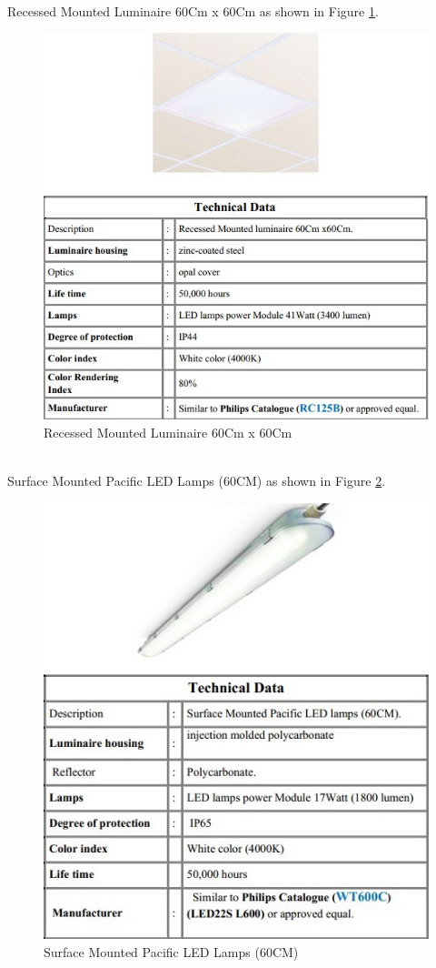 \documentclass[12pt,fleqn]{book} %
\begin{document}
\newpage
\\Recessed Mounted Luminaire 60Cm x 60Cm as shown in Figure \ref{fig:fikry 14}.
\begin{figure}[!h]
    \centering
    \includegraphics[width=1\linewidth]{fikry 14.png}
    \caption{Recessed Mounted Luminaire 60Cm x 60Cm}
    \label{fig:fikry 14}
\end{figure}
\newpage
\\ Surface Mounted Pacific LED Lamps (60CM) as shown in Figure \ref{fig:fikry 15}.
\begin{figure}[!h]
    \centering
    \includegraphics[width=1\linewidth]{fikry 15.png}
    \caption{Surface Mounted Pacific LED Lamps (60CM)}
    \label{fig:fikry 15}
\end{figure}
\end{document}
